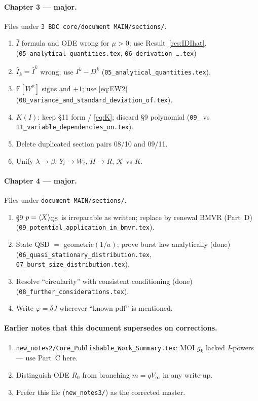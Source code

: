 \documentclass[11pt,a4paper]{article}
\newcommand{\E}{\mathbb{E}}
\newcommand{\Ihat}{\widehat{I}}
\theoremstyle{plain}
\theoremstyle{definition}
\theoremstyle{remark}
\begin{document}
\paragraph{Chapter 3 --- major.}
Files under \texttt{3 BDC core/document MAIN/sections/}.
\begin{enumerate}
\item $\Ihat$ formula and ODE wrong for $\mu>0$; use Result~\ref{res:IDIhat}.
  (\texttt{05\_analytical\_quantities.tex}, \texttt{06\_derivation\_\ldots.tex})
\item $\Ihat_k=\Ihat^k$ wrong; use $I^k-D^k$
  (\texttt{05\_analytical\_quantities.tex}).
\item $\E[W^2]$ signs and $+1$; use \eqref{eq:EW2}
  (\texttt{08\_variance\_and\_standard\_deviation\_of.tex}).
\item $K(I)$: keep \S11 form / \eqref{eq:K}; discard \S9 polynomial
  (\texttt{09\_} vs \texttt{11\_variable\_dependencies\_on.tex}).
\item Delete duplicated section pairs 08/10 and 09/11.
\item Unify $\lambda\to\beta$, $Y_t\to W_t$, $H\to R$, $\mathcal{K}$ vs $K$.
\end{enumerate}

\paragraph{Chapter 4 --- major.}
Files under \texttt{document MAIN/sections/}.
\begin{enumerate}
\item \S9 $p=\langle X\rangle_{\rm QS}$ is irreparable as written; replace by
  renewal BMVR (Part~D)
  (\texttt{09\_potential\_application\_in\_bmvr.tex}).
\item State QSD $=$ geometric$(1/a)$; prove burst law analytically (done)
  (\texttt{06\_quasi\_stationary\_distribution.tex},
  \texttt{07\_burst\_size\_distribution.tex}).
\item Resolve ``circularity'' with consistent conditioning (done)
  (\texttt{08\_further\_considerations.tex}).
\item Write $\varphi=\delta J$ wherever ``known pdf'' is mentioned.
\end{enumerate}

\paragraph{Earlier notes that this document supersedes on corrections.}
\begin{enumerate}
\item \texttt{new\_notes2/Core\_Publishable\_Work\_Summary.tex}:
  MOI $g_k$ lacked $I$-powers --- use Part~C here.
\item Distinguish ODE $R_0$ from branching $m=q V_\infty$ in any write-up.
\item Prefer this file (\texttt{new\_notes3/}) as the corrected master.
\end{enumerate}
\end{document}
